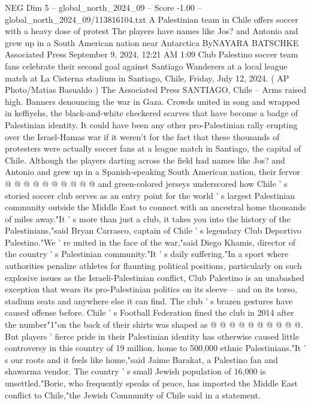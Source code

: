 \begin{textsample}{NEG Dim 5 – global\_north\_2024\_09 – Score -1.00 – global\_north\_2024\_09/113816104.txt}  \label{ex:f5_neg_145}
A Palestinian team in Chile offers soccer with a heavy dose of protest The players have names like Jos? and Antonio and grew up in a South American nation near Antarctica ByNAYARA BATSCHKE Associated Press September 9, 2024, 12:21 AM 1:09 Club Palestino soccer team fans celebrate their second goal against Santiago Wanderers at a local league match at La Cisterna stadium in Santiago, Chile, Friday, July 12, 2024. ( AP Photo/Matias Basualdo ) The Associated Press SANTIAGO, Chile -- Arms raised high.
Banners denouncing the war in Gaza.
Crowds united in song and wrapped in keffiyehs, the black-and-white checkered scarves that have become a badge of Palestinian identity.
It could have been any other pro-Palestinian rally erupting over the Israel-Hamas war if it weren't for the fact that these thousands of protesters were actually soccer fans at a league match in Santiago, the capital of Chile.
Although the players darting across the field had names like Jos? and Antonio and grew up in a Spanish-speaking South American nation, their fervor @ @ @ @ @ @ @ @ @ @ and green-colored jerseys underscored how Chile ' s storied soccer club serves as an entry point for the world ' s largest Palestinian community outside the Middle East to connect with an ancestral home thousands of miles away."It ' s more than just a club, it takes you into the history of the Palestinians,"said Bryan Carrasco, captain of Chile ' s legendary Club Deportivo Palestino."We ' re united in the face of the war,"said Diego Khamis, director of the country ' s Palestinian community."It ' s daily suffering."In a sport where authorities penalize athletes for flaunting political positions, particularly on such explosive issues as the Israeli-Palestinian conflict, Club Palestino is an unabashed exception that wears its pro-Palestinian politics on its sleeve -- and on its torso, stadium seats and anywhere else it can find.
The club ' s brazen gestures have caused offense before.
Chile ' s Football Federation fined the club in 2014 after the number"1"on the back of their shirts was shaped as @ @ @ @ @ @ @ @ @ @.
But players ' fierce pride in their Palestinian identity has otherwise caused little controversy in this country of 19 million, home to 500,000 ethnic Palestinians."It ' s our roots and it feels like home,"said Jaime Barakat, a Palestino fan and shawarma vendor.
The country ' s small Jewish population of 16,000 is unsettled."Boric, who frequently speaks of peace, has imported the Middle East conflict to Chile,"the Jewish Community of Chile said in a statement.

\end{textsample}
